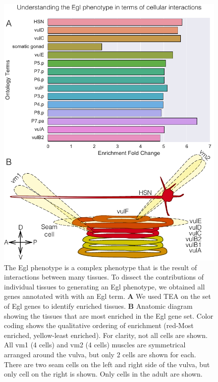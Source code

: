 \documentclass[10pt,letterpaper,twocolumn]{article}
\begin{document}
\begin{figure}[htbp]
  \renewcommand{\familydefault}{\sfdefault}\normalfont{}
  \centering
  \includegraphics[width=\linewidth]{Egl-phenotype.pdf}
  \caption{The Egl phenotype is a complex phenotype that is the result of
  interactions between many tissues. To dissect the contributions of individual
  tissues to generating an Egl phenotype, we obtained all genes annotated with
  with an Egl term. \textbf{A} We used TEA on the set of Egl genes to identify
  enriched tissues. \textbf{B} Anatomic diagram showing the tissues that are
  most enriched in the Egl gene set. Color coding shows the qualitative
  ordering of enrichment (red-Most enriched, yellow-least enriched). For clarity,
  not all cells are shown. All vm1 (4 cells) and vm2 (4 cells) muscles are
  symmetrical arranged around the vulva, but only 2 cells are shown for each.
  There are two seam cells on the left and right side of the vulva, but only
  cell on the right is shown. Only cells in the adult are shown.}
\label{fig:egl}
\end{figure}
\end{document}
